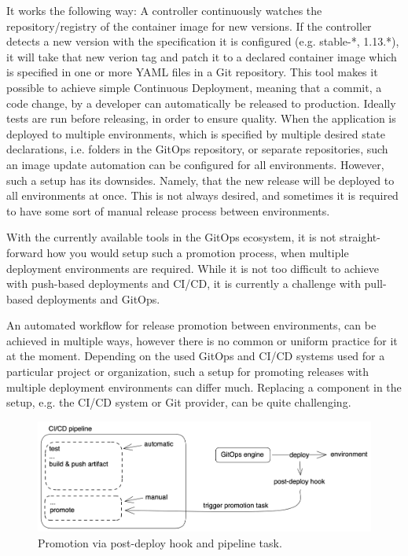 It works the following way: A controller continuously watches the repository/registry of the container image for new versions.
If the controller detects a new version with the specification it is configured (e.g. stable-*, 1.13.*),
it will take that new verion tag and patch it to a declared container image which is specified in one or more YAML files in a Git repository.
This tool makes it possible to achieve simple Continuous Deployment,
meaning that a commit, a code change, by a developer can automatically be released to production.
Ideally tests are run before releasing, in order to ensure quality.
When the application is deployed to multiple environments, which is specified by multiple desired state declarations,
i.e. folders in the GitOps repository, or separate repositories,
such an image update automation can be configured for all environments.
However, such a setup has its downsides.
Namely, that the new release will be deployed to all environments at once.
This is not always desired, and sometimes it is required to have some sort of manual release process between environments.

With the currently available tools in the GitOps ecosystem,
it is not straight-forward how you would setup such a promotion process,
when multiple deployment environments are required.
While it is not too difficult to achieve with push-based deployments and CI/CD,
it is currently a challenge with pull-based deployments and GitOps.


An automated workflow for release promotion between environments,
can be achieved in multiple ways,
however there is no common or uniform practice for it at the moment.
Depending on the used GitOps and CI/CD systems used for a particular project or organization,
such a setup for promoting releases with multiple deployment environments can differ much.
Replacing a component in the setup, e.g. the CI/CD system or Git provider, can be quite challenging.

\begin{figure}[h]
	\centering
	\includegraphics[width=0.99\linewidth]{assets/promotion-by-pipeline-task-post-deploy-hook.png}
	\caption{Promotion via post-deploy hook and pipeline task.
	}
	\label{fig:promotion-by-pipeline-task-post-deploy-hook}	
\end{figure}

